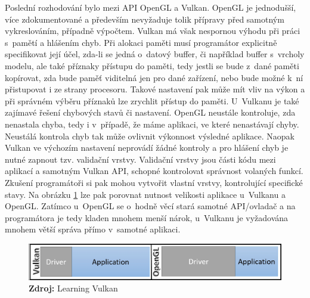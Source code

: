Poslední rozhodování bylo mezi API OpenGL a Vulkan. OpenGL je jednodušší, více zdokumentované a především nevyžaduje tolik přípravy před samotným vykreslováním, případně výpočtem. Vulkan má však nespornou výhodu při práci s~pamětí a hlášením chyb. Při alokaci paměti musí programátor explicitně specifikovat její účel, zda-li se jedná o~datový buffer, či například buffer s~vrcholy modelu, ale také příznaky přístupu do paměti, tedy jestli se bude z~dané paměti kopírovat, zda bude paměť viditelná jen pro dané zařízení, nebo bude možné k~ní přistupovat i ze strany procesoru. Takové nastavení pak může mít vliv na výkon a při správném výběru příznaků lze zrychlit přístup do paměti. U~Vulkanu je také zajímavé řešení chybových stavů či nastavení. OpenGL neustále kontroluje, zda nenastala chyba, tedy i v~případě, že máme aplikaci, ve které nenastávají chyby. Neustálá kontrola chyb tak může ovlivnit výkonnost výsledné aplikace. Naopak Vulkan ve výchozím nastavení neprovádí žádné kontroly a pro hlášení chyb je nutné zapnout tzv. validační vrstvy. Validační vrstvy jsou části kódu mezi aplikací a samotným Vulkan API, schopné kontrolovat správnost volaných funkcí. Zkušení programátoři si pak mohou vytvořit vlastní vrstvy, kontrolující specifické stavy. Na obrázku \ref{fig:VulXogl} lze pak porovnat nutnost velikosti aplikace u~Vulkanu a OpenGL. Zatímco u~OpenGL se o~hodně věcí stará samotné API/ovladač a na programátora je tedy kladen mnohem menší nárok, u~Vulkanu je vyžadována mnohem větší správa přímo v~samotné aplikaci. \cite{singh2016learning} \cite{VulkanTut}

\begin{figure}[hbt]
	\centering
	\captionsetup{justification=centering}
	\includegraphics[scale=0.5]{obrazky-figures/vulkanXogl.jpg}
	\textbf{Zdroj: } Learning Vulkan \cite{singh2016learning}
	\label{fig:VulXogl}
\end{figure}

